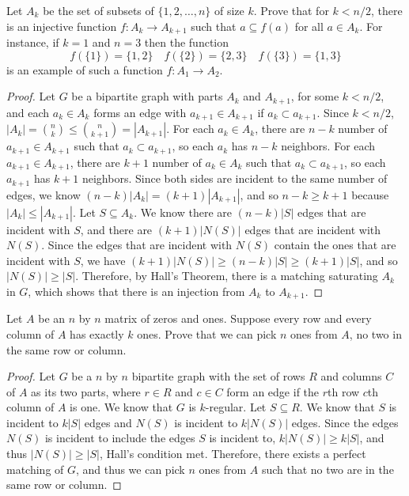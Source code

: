 \documentclass{article}
\newenvironment{problem}[2][Problem]{\begin{trivlist}
\item[\hskip \labelsep {\bfseries #1}\hskip \labelsep {\bfseries #2.}]}{\end{trivlist}}
\begin{document}
\begin{problem}{3.8.9}
    Let $A_k$ be the set of subsets of $\{1,2, \dots , n\}$ of size $k$. Prove that for $k < n/2$, there is an injective function $f: A_k \rightarrow A_{k+1}$ such that $a \subseteq f(a)$ for all $a \in A_k$. For instance, if $k = 1$ and $n = 3$ then the function
    \[
        f(\{1\}) = \{1, 2\} \quad f(\{2\}) = \{2, 3\} \quad f(\{3\}) = \{1, 3\}
    \]
    is an example of such a function $f: A_1 \rightarrow A_2$.
\end{problem}

\begin{proof}
    Let $G$ be a bipartite graph with parts $A_k$ and $A_{k+1}$, for some $k < n / 2$, and each $a_k \in A_k$ forms an edge with $a_{k+1} \in A_{k+1}$ if $a_k \subset a_{k+1}$. Since $k < n / 2$, $|A_k| = {n \choose k} \leq {n \choose k + 1} = |A_{k+1}|$. For each $a_k \in A_k$, there are $n - k$ number of $a_{k+1} \in A_{k+1}$ such that $a_k \subset a_{k+1}$, so each $a_k$ has $n - k$ neighbors. For each $a_{k+1} \in A_{k+1}$, there are $k + 1$ number of $a_k \in A_k$ such that $a_k \subset a_{k+1}$, so each $a_{k+1}$ has $k + 1$ neighbors. Since both sides are incident to the same number of edges, we know $(n - k)|A_k| = (k + 1)|A_{k+1}|$, and so $n - k \geq k + 1$ because $|A_k| \leq |A_{k+1}|$. Let $S \subseteq A_k$. We know there are $(n - k)|S|$ edges that are incident with $S$, and there are $(k + 1)|N(S)|$ edges that are incident with $N(S)$. Since the edges that are incident with $N(S)$ contain the ones that are incident with $S$, we have $(k + 1)|N(S)| \geq (n - k)|S| \geq (k + 1)|S|$, and so $|N(S)| \geq |S|$. Therefore, by Hall's Theorem, there is a matching saturating $A_k$ in $G$, which shows that there is an injection from $A_k$ to $A_{k+1}$.
\end{proof}

\begin{problem}{3.8.11}
    Let $A$ be an $n$ by $n$ matrix of zeros and ones. Suppose every row and every column of $A$ has exactly $k$ ones. Prove that we can pick $n$ ones from $A$, no two in the same row or column.
\end{problem}

\begin{proof}
    Let $G$ be a $n$ by $n$ bipartite graph with the set of rows $R$ and columns $C$ of $A$ as its two parts, where $r \in R$ and $c \in C$ form an edge if the $r$th row $c$th column of $A$ is one. We know that $G$ is $k$-regular. Let $S \subseteq R$. We know that $S$ is incident to $k|S|$ edges and $N(S)$ is incident to $k|N(S)|$ edges. Since the edges $N(S)$ is incident to include the edges $S$ is incident to, $k|N(S)| \geq k|S|$, and thus $|N(S)| \geq |S|$, Hall's condition met. Therefore, there exists a perfect matching of $G$, and thus we can pick $n$ ones from $A$ such that no two are in the same row or column.
\end{proof}
\end{document}
